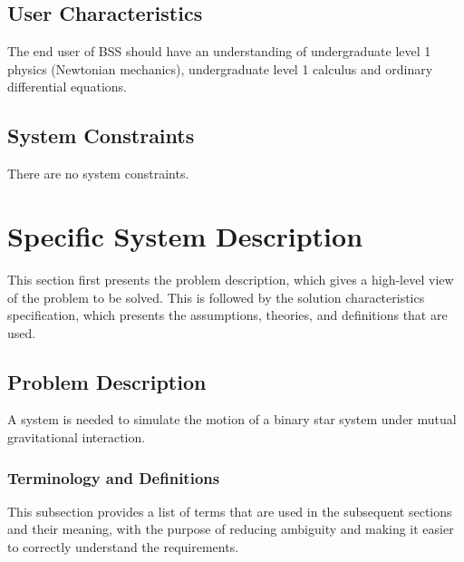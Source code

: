 \documentclass[12pt]{article}
\begin{document}
\subsection{User Characteristics}
\label{Sec:UserChars}
The end user of BSS should have an understanding of undergraduate level 1 physics (Newtonian mechanics), undergraduate level 1 calculus and ordinary differential equations.

\subsection{System Constraints}
\label{Sec:SysConstraints}
There are no system constraints.

\section{Specific System Description}
\label{Sec:SpecSystDesc}
This section first presents the problem description, which gives a high-level view of the problem to be solved. This is followed by the solution characteristics specification, which presents the assumptions, theories, and definitions that are used.

\subsection{Problem Description}
\label{Sec:ProbDesc}
A system is needed to simulate the motion of a binary star system under mutual gravitational interaction.

\subsubsection{Terminology and Definitions}
\label{Sec:TermDefs}
This subsection provides a list of terms that are used in the subsequent sections and their meaning, with the purpose of reducing ambiguity and making it easier to correctly understand the requirements.
\end{document}
